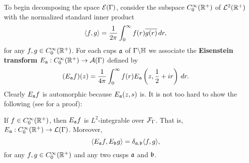       To begin decomposing the space $\mathcal{E}(\Gamma)$, consider the subspace $C_{0}^{\infty}(\mathbb{R}^{+})$ of $\mathcal{L}^{2}(\mathbb{R}^{+})$ with the normalized standard inner product
      \[
        \langle f,g\rangle = \frac{1}{2\pi}\int_{0}^{\infty}f(r)\overline{g(r)}\,dr,
      \]
      for any $f,g \in C_{0}^{\infty}(\mathbb{R}^{+})$. For each cups $\mathfrak{a}$ of $\Gamma\backslash\mathbb{H}$ we associate the \textbf{Eisenstein transform} $E_{\mathfrak{a}}:C_{0}^{\infty}(\mathbb{R}^{+}) \to \mathcal{A}(\Gamma)$ defined by
      \[
        (E_{\mathfrak{a}}f)(z) = \frac{1}{4\pi}\int_{0}^{\infty}f(r)E_{\mathfrak{a}}\left(z,\frac{1}{2}+ir\right)\,dr.
      \]
      Clearly $E_{\mathfrak{a}}f$ is automorphic because $E_{\mathfrak{a}}(z,s)$ is. It is not too hard to show the following (see \cite{iwaniec2002spectral} for a proof):

      \begin{proposition}\label{prop:Eisenstein_transform_property}
        If $f \in C_{0}^{\infty}(\mathbb{R}^{+})$, then $E_{\mathfrak{a}}f$ is $L^{2}$-integrable over $\mathcal{F}_{\Gamma}$. That is, $E_{\mathfrak{a}}:C_{0}^{\infty}(\mathbb{R}^{+}) \to \mathcal{L}(\Gamma)$. Moreover,
        \[
          \langle E_{\mathfrak{a}}f,E_{\mathfrak{b}}g\rangle = \delta_{\mathfrak{a},\mathfrak{b}}\langle f,g\rangle,
        \]
        for any $f,g \in C_{0}^{\infty}(\mathbb{R}^{+})$ and any two cusps $\mathfrak{a}$ and $\mathfrak{b}$.
      \end{proposition}

